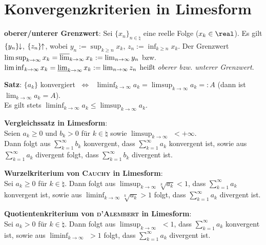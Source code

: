 \pagebreak

\section{%
    Konvergenzkriterien in Limesform%
}

\textbf{oberer/unterer Grenzwert}:
Sei $\{x_n\}_{n \in \natural}$ eine reelle Folge ($x_k \in \real$).
Es gilt $\{y_n\}\!\!\downarrow$, $\{z_n\}\!\!\uparrow$, wobei
$y_n := \sup_{k \ge n} x_k$, $z_n := \inf_{k \ge n} x_k$.
Der Grenzwert $\limsup_{k \to \infty} x_k = \varlimsup_{k \to \infty} x_k
:= \lim_{n \to \infty} y_n$ bzw.
$\liminf_{k \to \infty} x_k = \varliminf_{k \to \infty} x_k
:= \lim_{n \to \infty} z_n$ heißt \emph{oberer bzw. unterer Grenzwert}.

\textbf{Satz}:
$\{a_k\}$ konvergiert $\;\Leftrightarrow\;$
$\liminf_{k \to \infty} a_k = \limsup_{k \to \infty} a_k =: A$ (dann ist
$\lim_{k \to \infty} a_k = A$). \\
Es gilt stets $\liminf_{k \to \infty} a_k \le \limsup_{k \to \infty} a_k$.

\linie

\textbf{Vergleichssatz in Limesform}: \\
Seien $a_k \ge 0$ und $b_k > 0$ für $k \in \natural$ sowie
$\limsup_{k \to \infty}$  $< +\infty$. \\
Dann folgt aus $\sum_{k=1}^\infty b_k$ konvergent, dass
$\sum_{k=1}^\infty a_k$ konvergent ist, sowie aus
$\sum_{k=1}^\infty a_k$ divergent folgt, dass
$\sum_{k=1}^\infty b_k$ divergent ist.

\textbf{Wurzelkriterium von \textsc{Cauchy} in Limesform}: \\
Sei $a_k \ge 0$ für $k \in \natural$.
Dann folgt aus $\limsup_{k \to \infty} \sqrt[k]{a_k} < 1$,
dass $\sum_{k=1}^\infty a_k$ konvergent ist, sowie aus
$\liminf_{k \to \infty} \sqrt[k]{a_k} > 1$ folgt,
dass $\sum_{k=1}^\infty a_k$ divergent ist.

\textbf{Quotientenkriterium von \textsc{d'Alembert} in Limesform}: \\
Sei $a_k > 0$ für $k \in \natural$.
Dann folgt aus $\limsup_{k \to \infty}$  $< 1$,
dass $\sum_{k=1}^\infty a_k$ konvergent ist, sowie aus
$\liminf_{k \to \infty}$  $> 1$ folgt,
dass $\sum_{k=1}^\infty a_k$ divergent ist.


